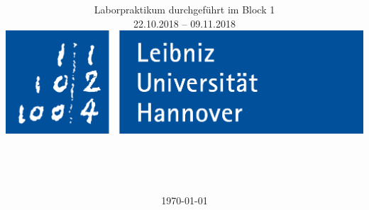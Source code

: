 \title{\Versuchsname $ $ \Versuchsnummer}
\subtitle{Laborpraktikum durchgeführt im Block 1\\
22.10.2018 – 09.11.2018\vspace{1cm}\\ \includegraphics[width=.75\linewidth]{IMAGE/luh_logo.png}}
\author{
\authA\\
\matA
\and
\authB\\
\matB
}
\date{\today}

\pagestyle{empty} %
\setcounter{page}{0} %
\maketitle %

\newpage 

\thispagestyle{empty}
\tableofcontents
\pagestyle{scrheadings}

\setcounter{page}{1}
\newpage
